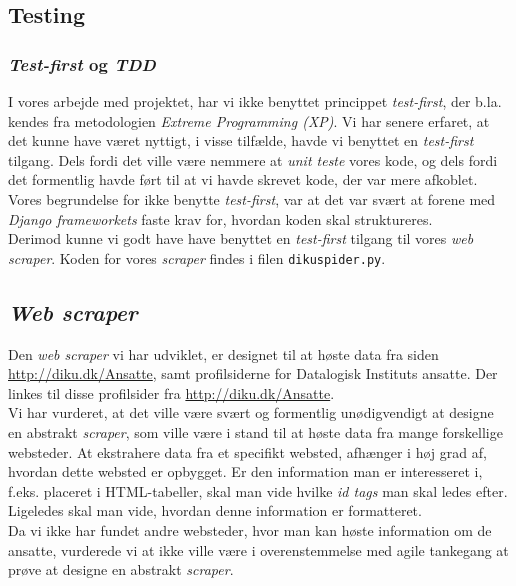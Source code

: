 \documentclass[12pt]{article}
\begin{document}
\subsection{Testing}
\subsubsection{\textit{Test-first} og \textit{TDD}}
I vores arbejde med projektet, har vi ikke benyttet princippet \textit{test-first}, der b.la. kendes fra metodologien \textit{Extreme Programming (XP)}.
Vi har senere erfaret, at det kunne have været nyttigt, i visse tilfælde, havde vi benyttet en \textit{test-first} tilgang. Dels fordi det ville være nemmere at \textit{unit teste} vores kode, og dels fordi det formentlig havde ført til at vi havde skrevet kode, der var mere afkoblet. \\
Vores begrundelse for ikke benytte \textit{test-first}, var at det var svært at forene med \textit{Django frameworkets} faste krav for, hvordan koden skal struktureres. \\
Derimod kunne vi godt have have benyttet en \textit{test-first} tilgang til vores \textit{web scraper}. Koden for vores \textit{scraper} findes i filen \texttt{dikuspider.py}.

\subsection{\textit{Web scraper}}
Den \textit{web scraper} vi har udviklet, er designet til at høste data fra siden \url{http://diku.dk/Ansatte}, samt profilsiderne for Datalogisk Instituts ansatte. Der linkes til disse profilsider fra \url{http://diku.dk/Ansatte}.\\
Vi har vurderet, at det ville være svært og formentlig unødigvendigt at designe en abstrakt \textit{scraper}, som ville være i stand til at høste data fra mange forskellige websteder. At ekstrahere data fra et specifikt websted, afhænger i høj grad af, hvordan dette websted er opbygget. Er den information man er interesseret i, f.eks. placeret i  HTML-tabeller, skal man vide hvilke \textit{id tags} man skal ledes efter. Ligeledes skal man vide, hvordan denne information er formatteret. \\
Da vi ikke har fundet andre websteder, hvor man kan høste information om de ansatte, vurderede vi at ikke ville være i overenstemmelse med agile tankegang at prøve at designe en abstrakt \textit{scraper}.
\end{document}
